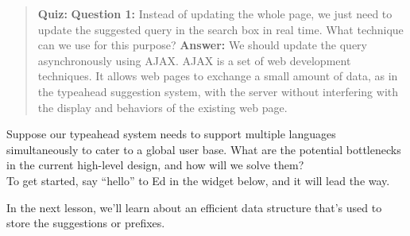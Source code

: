\begin{quote}
\textbf{Quiz:}
\textbf{Question 1:} Instead of updating the whole page, we just need to update the suggested query in the search box in real time. What technique can we use for this purpose?
\textbf{Answer:} We should update the query asynchronously using AJAX. AJAX is a set of web development techniques. It allows web pages to exchange a small amount of data, as in the typeahead suggestion system, with the server without interfering with the display and behaviors of the existing web page.
\end{quote}

Suppose our typeahead system needs to support multiple languages simultaneously to cater to a global user base. What are the potential bottlenecks in the current high-level design, and how will we solve them?
\\
To get started, say ``hello'' to Ed in the widget below, and it will lead the way.

In the next lesson, we'll learn about an efficient data structure that's used to store the suggestions or prefixes.



